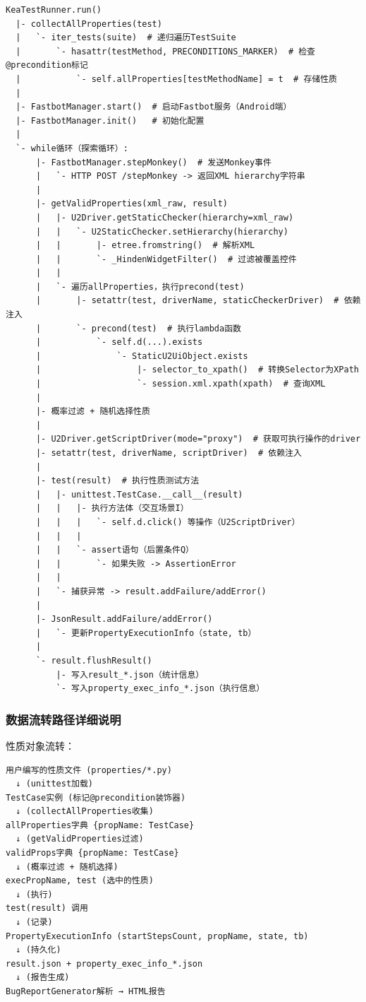 \documentclass[a4paper, zihao=-4]{ctexart}
\newcommand{\bff}[1]{{\heiti #1}}
\begin{document}
\begin{Verbatim}[fontsize=\footnotesize]
KeaTestRunner.run()
  |- collectAllProperties(test)
  |   `- iter_tests(suite)  # 递归遍历TestSuite
  |       `- hasattr(testMethod, PRECONDITIONS_MARKER)  # 检查@precondition标记
  |           `- self.allProperties[testMethodName] = t  # 存储性质
  |
  |- FastbotManager.start()  # 启动Fastbot服务（Android端）
  |- FastbotManager.init()   # 初始化配置
  |
  `- while循环（探索循环）:
      |- FastbotManager.stepMonkey()  # 发送Monkey事件
      |   `- HTTP POST /stepMonkey -> 返回XML hierarchy字符串
      |
      |- getValidProperties(xml_raw, result)
      |   |- U2Driver.getStaticChecker(hierarchy=xml_raw)
      |   |   `- U2StaticChecker.setHierarchy(hierarchy)
      |   |       |- etree.fromstring()  # 解析XML
      |   |       `- _HindenWidgetFilter()  # 过滤被覆盖控件
      |   |
      |   `- 遍历allProperties，执行precond(test)
      |       |- setattr(test, driverName, staticCheckerDriver)  # 依赖注入
      |       `- precond(test)  # 执行lambda函数
      |           `- self.d(...).exists
      |               `- StaticU2UiObject.exists
      |                   |- selector_to_xpath()  # 转换Selector为XPath
      |                   `- session.xml.xpath(xpath)  # 查询XML
      |
      |- 概率过滤 + 随机选择性质
      |
      |- U2Driver.getScriptDriver(mode="proxy")  # 获取可执行操作的driver
      |- setattr(test, driverName, scriptDriver)  # 依赖注入
      |
      |- test(result)  # 执行性质测试方法
      |   |- unittest.TestCase.__call__(result)
      |   |   |- 执行方法体（交互场景I）
      |   |   |   `- self.d.click() 等操作（U2ScriptDriver）
      |   |   |
      |   |   `- assert语句（后置条件Q）
      |   |       `- 如果失败 -> AssertionError
      |   |
      |   `- 捕获异常 -> result.addFailure/addError()
      |
      |- JsonResult.addFailure/addError()
      |   `- 更新PropertyExecutionInfo（state, tb）
      |
      `- result.flushResult()
          |- 写入result_*.json（统计信息）
          `- 写入property_exec_info_*.json（执行信息）
\end{Verbatim}

\subsubsection{数据流转路径详细说明}

\bff{性质对象流转}：
\begin{Verbatim}[fontsize=\footnotesize]
用户编写的性质文件 (properties/*.py)
  ↓ (unittest加载)
TestCase实例 (标记@precondition装饰器)
  ↓ (collectAllProperties收集)
allProperties字典 {propName: TestCase}
  ↓ (getValidProperties过滤)
validProps字典 {propName: TestCase}
  ↓ (概率过滤 + 随机选择)
execPropName, test (选中的性质)
  ↓ (执行)
test(result) 调用
  ↓ (记录)
PropertyExecutionInfo (startStepsCount, propName, state, tb)
  ↓ (持久化)
result.json + property_exec_info_*.json
  ↓ (报告生成)
BugReportGenerator解析 → HTML报告
\end{Verbatim}
\end{document}
